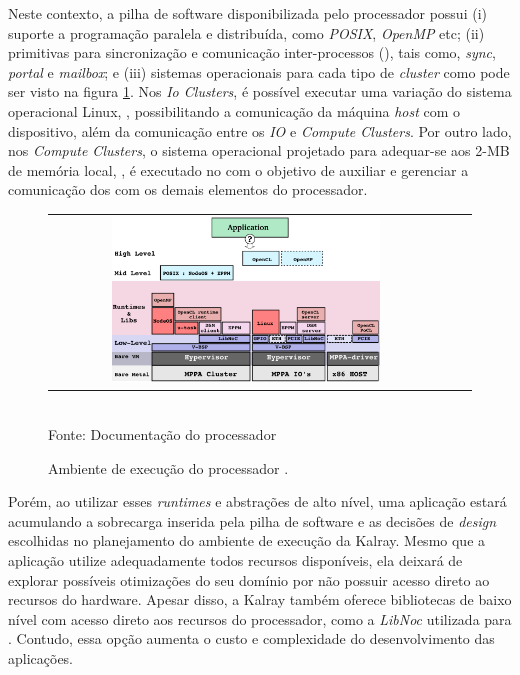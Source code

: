 \documentclass[
	12pt,				%
	openright,			%
	twoside,			%
	a4paper,			%
	english,			%
	brazil,				%
	]{abntex2}
\begin{document}
Neste contexto, a pilha de software disponibilizada pelo processador \mppa possui (i) suporte a programação paralela e distribuída, como \textit{POSIX}, \textit{OpenMP} etc; (ii) primitivas para sincronização e comunicação inter-processos (\ipc), tais como, \textit{sync}, \textit{portal} e \textit{mailbox}; e (iii) sistemas operacionais para cada tipo de \textit{cluster} como pode ser visto na figura \ref{figruntime}.
Nos \textit{Io Clusters}, é possível executar uma variação do sistema operacional Linux, \rtems, possibilitando a comunicação da máquina \textit{host} com o dispositivo, além da comunicação entre os \textit{IO} e \textit{Compute Clusters}.
Por outro lado, nos \textit{Compute Clusters}, o sistema operacional projetado para adequar-se aos 2-MB de memória local, \nodeos, é executado no \rman com o objetivo de auxiliar e gerenciar a comunicação dos \pe com os demais elementos do processador.


\begin{figure}[t]
	\begin{center}
    	\caption{Ambiente de execução do processador \mppa.}
           \label{figruntime}
		\begin{tabular}{ccc}
			\includegraphics[width=0.7\textwidth]{figs/software_stack.png} \\
		\end{tabular}
      \vspace{1ex} \\
      Fonte: Documentação do processador \mppa
     \end{center}
   \vspace{-2ex}
\end{figure}


Porém, ao utilizar esses \textit{runtimes} e abstrações de alto nível, uma aplicação estará acumulando a sobrecarga inserida pela pilha de software e as decisões de \textit{design} escolhidas no planejamento do ambiente de execução da Kalray.
Mesmo que a aplicação utilize adequadamente todos recursos disponíveis, ela deixará de explorar possíveis otimizações do seu domínio por não possuir acesso direto ao recursos do hardware.
Apesar disso, a Kalray também oferece bibliotecas de baixo nível com acesso direto aos recursos do processador, como a \textit{LibNoc} utilizada para \ipc.
Contudo, essa opção aumenta o custo e complexidade do desenvolvimento das aplicações.
\end{document}
